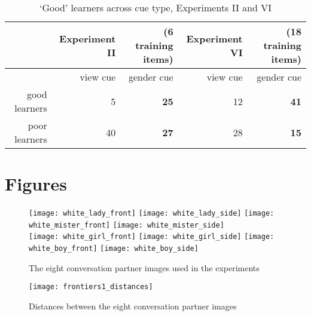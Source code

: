 \documentclass{frontiersSCNS} %
\begin{document}
\vspace{1cm}

\begin{table}[ht]
\centering
\begin{tabular}{rrrrr}

&Experiment II &(6 training items) & Experiment VI &(18 training items)\\

  \hline
 & view cue & gender cue & view cue & gender cue\\
  \hline
  good learners &   5 &  {\bf 25} & 12 & {\bf41} \\
poor learners &  40 &  {\bf 27} & 28 & {\bf15}\\
   \hline
\end{tabular}
\caption{ \large `Good' learners across cue type, Experiments II and VI}
\label{exp6table}
\end{table}

\clearpage

\section*{Figures}

\begin{figure}[ht]
\begin{center}
\texttt{[image: white\_lady\_front]}
\texttt{[image: white\_lady\_side]}
\texttt{[image: white\_mister\_front]}
\texttt{[image: white\_mister\_side]}\\
\texttt{[image: white\_girl\_front]}
\texttt{[image: white\_girl\_side]}
\texttt{[image: white\_boy\_front]}
\texttt{[image: white\_boy\_side]}
\end{center}
\caption{ \large The eight conversation partner images used in the experiments}
\label{int}
\end{figure}

\begin{figure}[ht]
\begin{center}
\texttt{[image: frontiers1\_distances]}
\end{center}
\caption{ \large Distances between the eight conversation partner images}
\label{levenshtein}
\end{figure}
\end{document}
